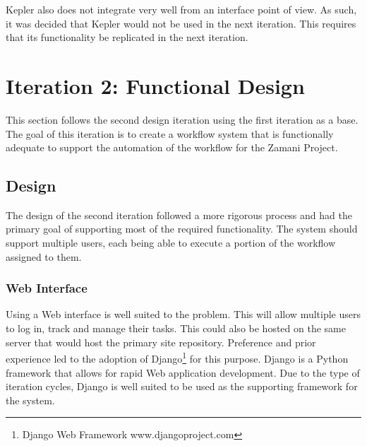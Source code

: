 Kepler also does not integrate very well from an interface point of view.
As such, it was decided that Kepler would not be used in the next iteration. This
requires that its functionality be replicated in the next iteration.

\section{Iteration 2: Functional Design\label{iteration2}}
This section follows the second design iteration using the first iteration
as a base. The goal of this iteration is to create a workflow system that is
functionally adequate to support the automation of the workflow for the Zamani
Project.

\subsection{Design}
The design of the second iteration followed a more rigorous process and had the
primary goal of supporting most of the required functionality. The system should
 support multiple users, each being able to execute a portion of the workflow
assigned to them.
\subsubsection{Web Interface}
Using a Web interface is well suited to the problem. This will allow multiple
users to log in, track and manage their tasks. This could also be hosted on the
same server that would host the primary site repository. Preference and prior
experience led to the adoption of Django\footnote{Django Web Framework
www.djangoproject.com} for this purpose. Django is a Python framework that allows
for rapid Web application development. Due to the type of iteration cycles, Django is
well suited to be used as the supporting framework for the system.

